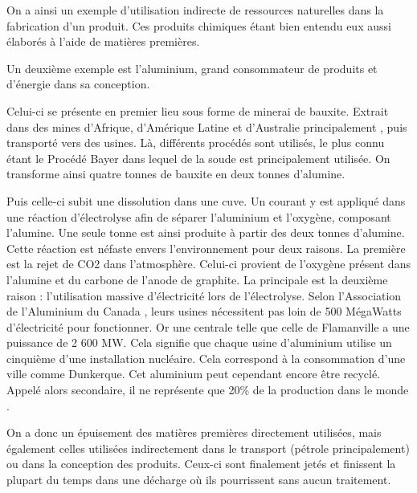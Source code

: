 On a ainsi un exemple d'utilisation indirecte de ressources naturelles dans la fabrication d'un produit. Ces produits chimiques étant bien entendu eux aussi élaborés à l'aide de matières premières. 

\medbreak Un deuxième exemple est l'aluminium, grand consommateur de produits et d’énergie dans sa conception.

Celui-ci se présente en premier lieu sous forme de minerai de bauxite. Extrait dans des mines d'Afrique, d'Amérique Latine et d'Australie principalement \cite{aluZonesExtraction}, puis transporté vers des usines. Là, différents procédés sont utilisés, le plus connu étant le Procédé Bayer dans lequel de la soude est principalement utilisée. On transforme ainsi quatre tonnes de bauxite en deux tonnes d'alumine. 

Puis celle-ci subit une dissolution dans une cuve. Un courant y est appliqué dans une réaction d'électrolyse afin de séparer l'aluminium et l'oxygène, composant l'alumine. Une seule tonne est ainsi produite à partir des deux tonnes d'alumine. Cette réaction est néfaste envers l'environnement pour deux raisons. La première est la rejet de CO2 dans l'atmosphère. Celui-ci provient de l'oxygène présent dans l'alumine et du carbone de l'anode de graphite. La principale est la deuxième raison : l'utilisation massive d’électricité lors de l'électrolyse. Selon l'Association de l'Aluminium du Canada \cite{consomUsinesAlu}, leurs usines nécessitent pas loin de 500 MégaWatts d’électricité pour fonctionner. Or une centrale telle que celle de Flamanville a une puissance de 2 600 MW. Cela signifie que chaque usine d'aluminium utilise un cinquième d'une installation nucléaire. Cela correspond à la consommation d'une ville comme Dunkerque.
Cet aluminium peut cependant encore être recyclé. Appelé alors secondaire, il ne représente que 20\% de la production dans le monde \cite{worldAluProdRecycl}. 

\bigbreak On a donc un épuisement des matières premières directement utilisées, mais également celles utilisées indirectement dans le transport (pétrole principalement) ou dans la conception des produits. Ceux-ci sont finalement jetés et finissent la plupart du temps dans une décharge où ils pourrissent sans aucun traitement.

